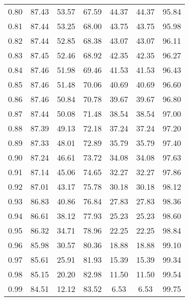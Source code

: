 \begin{tabular}{|c|c|c|c|c|c|c|}
      0.80 &     87.43 &     53.57 &      67.59 &   44.37 &      44.37 &         95.84 \\
      0.81 &     87.44 &     53.25 &      68.00 &   43.75 &      43.75 &         95.98 \\
      0.82 &     87.44 &     52.85 &      68.38 &   43.07 &      43.07 &         96.11 \\
      0.83 &     87.45 &     52.46 &      68.92 &   42.35 &      42.35 &         96.27 \\
      0.84 &     87.46 &     51.98 &      69.46 &   41.53 &      41.53 &         96.43 \\
      0.85 &     87.46 &     51.48 &      70.06 &   40.69 &      40.69 &         96.60 \\
      0.86 &     87.46 &     50.84 &      70.78 &   39.67 &      39.67 &         96.80 \\
      0.87 &     87.44 &     50.08 &      71.48 &   38.54 &      38.54 &         97.00 \\
      0.88 &     87.39 &     49.13 &      72.18 &   37.24 &      37.24 &         97.20 \\
      0.89 &     87.33 &     48.01 &      72.89 &   35.79 &      35.79 &         97.40 \\
      0.90 &     87.24 &     46.61 &      73.72 &   34.08 &      34.08 &         97.63 \\
      0.91 &     87.14 &     45.06 &      74.65 &   32.27 &      32.27 &         97.86 \\
      0.92 &     87.01 &     43.17 &      75.78 &   30.18 &      30.18 &         98.12 \\
      0.93 &     86.83 &     40.86 &      76.84 &   27.83 &      27.83 &         98.36 \\
      0.94 &     86.61 &     38.12 &      77.93 &   25.23 &      25.23 &         98.60 \\
      0.95 &     86.32 &     34.71 &      78.96 &   22.25 &      22.25 &         98.84 \\
      0.96 &     85.98 &     30.57 &      80.36 &   18.88 &      18.88 &         99.10 \\
      0.97 &     85.61 &     25.91 &      81.93 &   15.39 &      15.39 &         99.34 \\
      0.98 &     85.15 &     20.20 &      82.98 &   11.50 &      11.50 &         99.54 \\
      0.99 &     84.51 &     12.12 &      83.52 &    6.53 &       6.53 &         99.75 \\
\bottomrule
\end{tabular}

